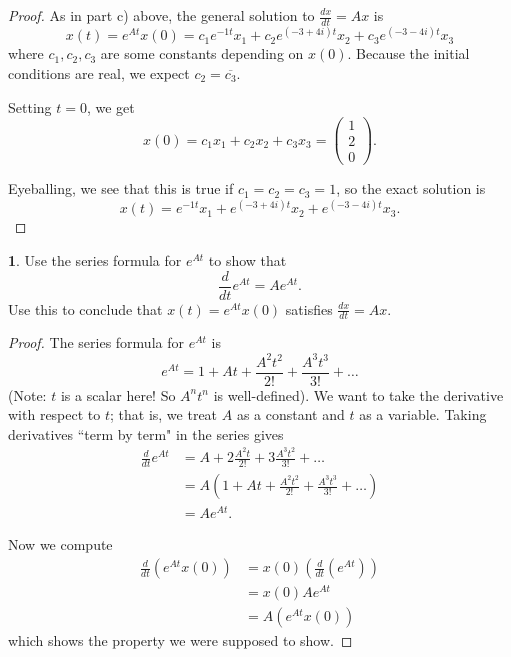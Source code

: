 \documentclass{article}
\theoremstyle{definition}
\newtheorem{prob}{}
\begin{document}
\begin{proof}
	As in part c) above, the general solution to $\frac{dx}{dt}= Ax$ is 
			\[x(t)= e^{At}x(0)=c_1 e^{-1t}x_1 + c_2 e^{(-3+4i)t}x_2 +c_3 e^{(-3-4i)t}x_3\]
			where $c_1, c_2, c_3$ are some constants depending on $x(0)$. Because the initial conditions are real, we expect $c_2=\overline{c_3}$. 
			
			Setting $t=0$, we get
			\[x(0)= c_1 x_1 + c_2 x_2+c_3 x_3= \begin{pmatrix}
				1\\2\\0
			\end{pmatrix}.\]
		
		Eyeballing, we see that this is true if $c_1=c_2=c_3=1$, so the exact solution is 
		\[x(t)=  e^{-1t}x_1 + e^{(-3+4i)t}x_2 + e^{(-3-4i)t}x_3.\]
\end{proof}

\begin{prob}
	Use the series formula for $e^{At}$ to show that
	\[\frac{d}{dt}e^{At}= A e^{At}.\]
	Use this to conclude that $x(t)= e^{At}x(0)$ satisfies $\frac{dx}{dt}= Ax$.
\end{prob}

\begin{proof}
	The series formula for $e^{At}$ is 
	\[e^{At}= 1+ At + \frac{A^2t^2}{2!}+ \frac{A^3t^3}{3!}+\dots \]
	(Note: $t$ is a scalar here! So $A^nt^n$ is well-defined). We want to take the derivative with respect to $t$; that is, we treat $A$ as a constant and $t$ as a variable. Taking derivatives ``term by term" in the series gives 
	\begin{align*}
		\frac{d}{dt} e^{At}&= A + 2 \frac{A^2 t}{2!} + 3 \frac{A^3t^2}{3!}+ \dots \\
		&= A(1+ At + \frac{A^2t^2}{2!}+ \frac{A^3t^3}{3!}+\dots )\\
		&= A e^{At}.
	\end{align*}

Now we compute 
\begin{align*}
	\frac{d}{dt}(e^{At}x(0))&= x(0)\left(\frac{d}{dt}(e^{At}) \right)\\
	&= x(0)A e^{At}\\
	&= A (e^{At}x(0))
\end{align*}
which shows the property we were supposed to show.
	
\end{proof}
\end{document}
